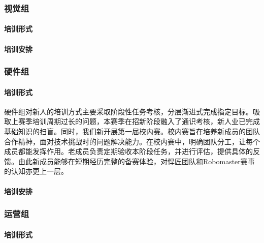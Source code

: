 
        \subsubsection{视觉组}

            \paragraph{培训形式}

                

            \paragraph{培训安排}


        \subsubsection{硬件组}

            \paragraph{培训形式}

                硬件组对新人的培训方式主要采取阶段性任务考核，分层渐进式完成指定目标。吸取上赛季培训周期过长的问题，本赛季在招新阶段融入了通识考核，新人业已完成基础知识的扫盲。同时，我们新开展第一届校内赛。校内赛旨在培养新成员的团队合作精神，面对技术挑战时的问题解决能力。在校内赛中，明确团队分工，让每个成员都能发挥作用。老成员负责定期验收本阶段任务，并进行评估，提供具体的反馈。由此新成员能够在短期经历完整的备赛体验，对悍匠团队和Robomaster赛事的认知亦更上一层。

            \paragraph{培训安排}


        \subsubsection{运营组}

            \paragraph{培训形式}

